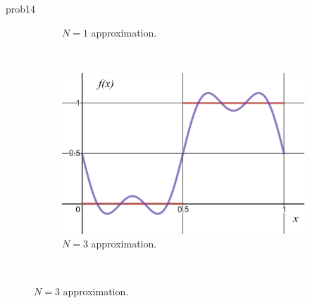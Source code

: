 \documentclass{article}
\begin{document}
\begin{solution}{}{prob14}
\begin{figure}[H]
\begin{subfigure}[h]{0.3\textwidth}
		\caption{$N=1$ approximation.}
	\end{subfigure}
	~
	\begin{subfigure}[h]{0.3\textwidth}
		\includegraphics[width=\textwidth]{N=3.png}
		\caption{$N=3$ approximation.}
	\end{subfigure}\\
	

\end{figure}
\end{solution}
\end{document}

